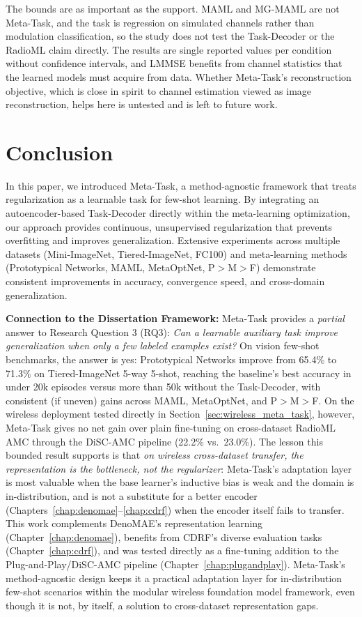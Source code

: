 The bounds are as important as the support. MAML and MG-MAML are not Meta-Task, and the task is regression on simulated channels rather than modulation classification, so the study does not test the Task-Decoder or the RadioML claim directly. The results are single reported values per condition without confidence intervals, and LMMSE benefits from channel statistics that the learned models must acquire from data. Whether Meta-Task's reconstruction objective, which is close in spirit to channel estimation viewed as image reconstruction, helps here is untested and is left to future work.

\section{Conclusion}\label{sec:meta_tasks_conclusion}


In this paper, we introduced Meta-Task, a method-agnostic framework that treats regularization as a learnable task for few-shot learning. By integrating an autoencoder-based Task-Decoder directly within the meta-learning optimization, our approach provides continuous, unsupervised regularization that prevents overfitting and improves generalization. Extensive experiments across multiple datasets (Mini-ImageNet, Tiered-ImageNet, FC100) and meta-learning methods (Prototypical Networks, MAML, MetaOptNet, P$>$M$>$F) demonstrate consistent improvements in accuracy, convergence speed, and cross-domain generalization.

\textbf{Connection to the Dissertation Framework:} Meta-Task provides a \emph{partial} answer to Research Question 3 (RQ3): \textit{Can a learnable auxiliary task improve generalization when only a few labeled examples exist?} On vision few-shot benchmarks, the answer is yes: Prototypical Networks improve from 65.4\% to 71.3\% on Tiered-ImageNet 5-way 5-shot, reaching the baseline's best accuracy in under 20k episodes versus more than 50k without the Task-Decoder, with consistent (if uneven) gains across MAML, MetaOptNet, and P$>$M$>$F. On the wireless deployment tested directly in Section~\ref{sec:wireless_meta_task}, however, Meta-Task gives no net gain over plain fine-tuning on cross-dataset RadioML AMC through the DiSC-AMC pipeline (22.2\% vs.\ 23.0\%). The lesson this bounded result supports is that \emph{on wireless cross-dataset transfer, the representation is the bottleneck, not the regularizer}: Meta-Task's adaptation layer is most valuable when the base learner's inductive bias is weak and the domain is in-distribution, and is not a substitute for a better encoder (Chapters~\ref{chap:denomae}--\ref{chap:cdrf}) when the encoder itself fails to transfer. This work complements DenoMAE's representation learning (Chapter~\ref{chap:denomae}), benefits from CDRF's diverse evaluation tasks (Chapter~\ref{chap:cdrf}), and was tested directly as a fine-tuning addition to the Plug-and-Play/DiSC-AMC pipeline (Chapter~\ref{chap:plugandplay}). Meta-Task's method-agnostic design keeps it a practical adaptation layer for in-distribution few-shot scenarios within the modular wireless foundation model framework, even though it is not, by itself, a solution to cross-dataset representation gaps.

